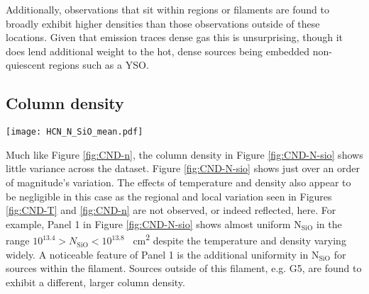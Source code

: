 \documentclass[twocolumn]{aastex631}
\begin{document}
Additionally, observations that sit within  regions or filaments are found to broadly exhibit higher densities than those observations outside of these locations. Given that  emission traces dense gas this is unsurprising, though it does lend additional weight to the hot, dense sources being embedded non-quiescent regions such as a YSO. 


\subsection{Column density} \label{sec:CND-gas-cond-N}

\begin{figure*}
    \centering
    \texttt{[image: HCN\_N\_SiO\_mean.pdf]}
    \caption{As per Figure \ref{fig:CND-n}, but here the colour of the circular regions represents  column density N$_{\mathrm{SiO}}$ towards each observation outlined in Section \ref{sec:obs}.}
    \label{fig:CND-N-sio}
\end{figure*}

Much like Figure \ref{fig:CND-n}, the  column density in Figure \ref{fig:CND-N-sio} shows little variance across the dataset. Figure \ref{fig:CND-N-sio} shows just over an order of magnitude's variation. The effects of temperature and density also appear to be negligible in this case as the regional and local variation seen in Figures \ref{fig:CND-T} and \ref{fig:CND-n} are not observed, or indeed reflected, here. For example, Panel 1 in Figure \ref{fig:CND-N-sio} shows almost uniform N$_{\mathrm{SiO}}$ in the range $10^{13.4} > N_{\mathrm{SiO}} < 10^{13.8}$ \si{\per\centi\meter\squared} despite the temperature and density varying widely. A noticeable feature of Panel 1 is the additional uniformity in N$_{\mathrm{SiO}}$ for sources within the  filament. Sources outside of this filament, e.g. G5, are found to exhibit a different, larger column density.
\end{document}
